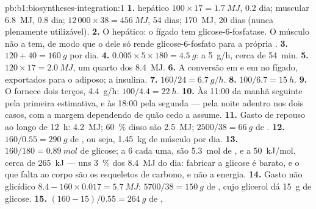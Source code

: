 \begin{solution}{pb:b1:biosyntheses-integration:1}
\textbf{1.}  hepático $100\times 17 = \qty{1.7}{MJ}$, 0.2 dia;
 muscular \qty{6.8}{MJ}, 0.8 dia;  $12\,000\times 38 =
\qty{456}{MJ}$, 54 dias;  \qty{170}{MJ}, 20 dias (nunca
plenamente utilizável).
\textbf{2.} O  hepático: o fígado tem glicose-6-fosfatase. O
músculo não a tem, de modo que o  dele só rende
glicose-6-fosfato para a própria .
\textbf{3.} $120 + 40 = \qty{160}{g}$ por dia.
\textbf{4.} $0.005\times 5\times 180 = \qty{4.5}{g}$: a \qty{5}{g/h}, cerca de \qty{54}{min}.
\textbf{5.} $120\times 17 = \qty{2.0}{MJ}$, um quarto dos \qty{8.4}{MJ}.
\textbf{6.} A conversão em  e em  no fígado,
exportados para o  adiposo; a insulina.
\textbf{7.} $160/24 = \qty{6.7}{g/h}$.
\textbf{8.} $100/6.7 = \qty{15}{h}$.
\textbf{9.} O  fornece dois terços, \qty{4.4}{g/h}: $100/4.4 =
\qty{22}{h}$.
\textbf{10.} Às 11:00 da manhã seguinte pela primeira estimativa, e às
18:00 pela segunda --- pela noite adentro nos dois casos, com a margem
dependendo de quão cedo a  assume.
\textbf{11.} Gasto de repouso ao longo de \qty{12}{h}: \qty{4.2}{MJ};
\qty{60}{\%} disso são \qty{2.5}{MJ}; $2500/38 = \qty{66}{g}$ de
.
\textbf{12.} $160/0.55 = \qty{290}{g}$ de , ou seja,
\qty{1.45}{kg} de músculo por dia.
\textbf{13.} $160/180 = \qty{0.89}{mol}$ de glicose; a 6  cada uma,
são \qty{5.3}{mol} de , e a \qty{50}{kJ/mol}, cerca de \qty{265}{kJ}
--- uns \qty{3}{\%} dos \qty{8.4}{MJ} do dia: fabricar a glicose é
barato, e o que falta ao corpo são os esqueletos de carbono, e não a
energia.
\textbf{14.} Gasto não glicídico $8.4 - 160\times 0.017 =
\qty{5.7}{MJ}$: $5700/38 = \qty{150}{g}$ de , cujo glicerol dá
\qty{15}{g} de glicose.
\textbf{15.} $(160 - 15)/0.55 = \qty{264}{g}$ de ,

\end{solution}
